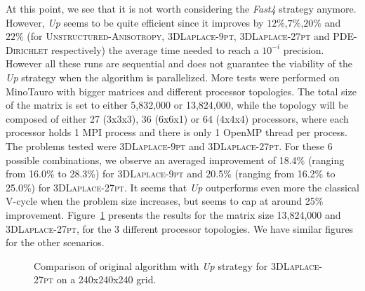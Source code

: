    At this point, we see that it is not worth considering the \emph{Fast4} strategy anymore. However, \emph{Up} seems to be
   quite efficient since it improves by $12\%$,$7\%$,$20\%$ and $22\%$ (for \textsc{Unstructured-Anisotropy}, \textsc{3DLaplace-9pt}, \textsc{3DLaplace-27pt} and \textsc{PDE-Dirichlet} respectively) the average time needed to reach
   a $10^{-i}$ precision.
   However all these runs are sequential and does not guarantee the viability of the \emph{Up} strategy when the algorithm is parallelized.
   More tests were performed on MinoTauro with bigger matrices and different processor topologies. The total size of the matrix is set to either
   5,832,000 or 13,824,000, while the topology will be composed of either 27 (3x3x3), 36 (6x6x1) or 64 (4x4x4) processors, where each processor holds 1 MPI process and there is only 1 OpenMP thread per process.
   The problems tested were \textsc{3DLaplace-9pt} and \textsc{3DLaplace-27pt}.
   For these 6 possible combinations, we observe an averaged improvement of 18.4\% (ranging from 16.0\% to 28.3\%) for \textsc{3DLaplace-9pt} and 20.5\% (ranging from 16.2\% to 25.0\%) for \textsc{3DLaplace-27pt}. It seems that \emph{Up} outperforms
   even more the classical V-cycle when the problem size increases, but seems to cap at around 25\% improvement. Figure~\ref{fig.mtup} presents the results for the matrix size 13,824,000 and \textsc{3DLaplace-27pt}, for the 3 different processor topologies. We have similar figures
   for the other scenarios.
   
   \begin{figure}[t]
    \caption{Comparison of original algorithm with \emph{Up} strategy for \textsc{3DLaplace-27pt} on a 240x240x240 grid.}
    \label{fig.mtup}
   \end{figure}
